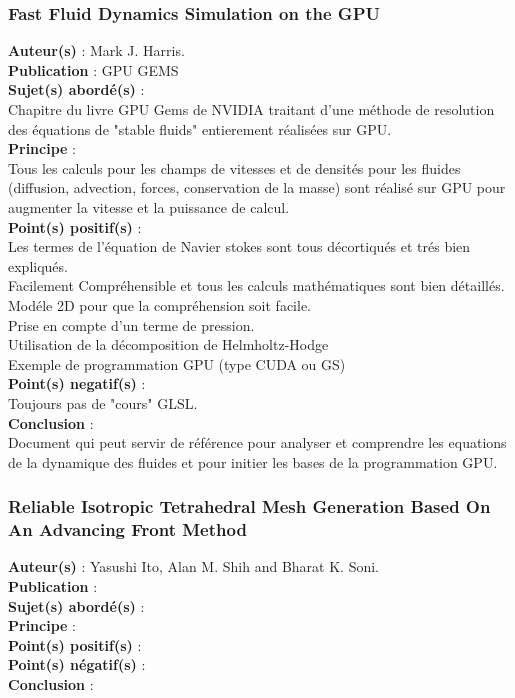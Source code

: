 \documentclass[a4paper,10pt]{article}
\begin{document}
\subsubsection{Fast Fluid Dynamics Simulation on the GPU}
\textbf{Auteur(s)} : Mark J. Harris.\\
\textbf{Publication} : GPU GEMS \\
\textbf{Sujet(s) abordé(s)} : \\ 
	Chapitre du livre GPU Gems de NVIDIA traitant d'une méthode de resolution des équations de "stable fluids" entierement réalisées sur GPU.\\
\textbf{Principe} :\\	
	Tous les calculs pour les champs de vitesses et de densités pour les fluides (diffusion, advection, forces, conservation de la masse) sont réalisé sur GPU pour augmenter la vitesse et la puissance de calcul.\\
\textbf{Point(s) positif(s)} :\\
	Les termes de l'équation de Navier stokes sont tous décortiqués et trés bien expliqués.\\
	Facilement Compréhensible et tous les calculs mathématiques sont bien détaillés.\\
	Modéle 2D pour que la compréhension soit facile.\\
	Prise en compte d'un terme de pression.\\
	Utilisation de la décomposition de Helmholtz-Hodge\\
	Exemple de programmation GPU (type CUDA ou GS)\\
\textbf{Point(s) negatif(s)} :\\
	Toujours pas de "cours" GLSL.\\
\textbf{Conclusion} :\\
	Document qui peut servir de référence pour analyser et comprendre les equations de la dynamique des fluides et pour initier les bases de la programmation GPU.\\







\subsubsection{Reliable Isotropic Tetrahedral Mesh Generation Based On An Advancing Front Method}
\textbf{Auteur(s)} : Yasushi Ito, Alan M. Shih and Bharat K. Soni.\\
\textbf{Publication} :\\
\textbf{Sujet(s) abordé(s)} : \\
\textbf{Principe} :\\	
\textbf{Point(s) positif(s)} :\\
\textbf{Point(s) négatif(s)} :\\
\textbf{Conclusion} :\\
\end{document}
